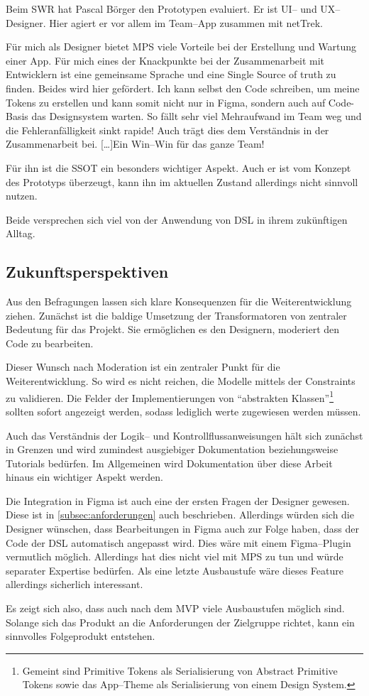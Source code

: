Beim \ac{SWR} hat Pascal Börger den Prototypen evaluiert.
Er ist \acs{UI}-- und \acs{UX}--Designer.
Hier agiert er vor allem im Team--App zusammen mit \ac{netTrek}.
\begin{displayquote}
    Für mich als Designer bietet MPS viele Vorteile bei der Erstellung und Wartung einer App.
    Für mich eines der Knackpunkte bei der Zusammenarbeit mit Entwicklern ist eine gemeinsame Sprache und eine Single Source of truth zu finden.
    Beides wird hier gefördert.
    Ich kann selbst den Code schreiben, um meine Tokens zu erstellen und kann somit nicht nur in Figma, sondern auch auf Code-Basis das Designsystem warten.
    So fällt sehr viel Mehraufwand im Team weg und die Fehleranfälligkeit sinkt rapide!
    Auch trägt dies dem Verständnis in der Zusammenarbeit bei.
    [\ldots]\@ Ein Win--Win für das ganze Team!
\end{displayquote}
Für ihn ist die \ac{SSOT} ein besonders wichtiger Aspekt.
Auch er ist vom Konzept des Prototyps überzeugt, kann ihn im aktuellen Zustand allerdings nicht sinnvoll nutzen.

Beide versprechen sich viel von der Anwendung von \ac{DSL} in ihrem zukünftigen Alltag.

\subsection{Zukunftsperspektiven}\label{subsec:zukunftsperspektive}
Aus den Befragungen lassen sich klare Konsequenzen für die Weiterentwicklung ziehen.
Zunächst ist die baldige Umsetzung der Transformatoren von zentraler Bedeutung für das Projekt.
Sie ermöglichen es den Designern, moderiert den Code zu bearbeiten.

Dieser Wunsch nach Moderation ist ein zentraler Punkt für die Weiterentwicklung.
So wird es nicht reichen, die Modelle mittels der Constraints zu validieren.
Die Felder der Implementierungen von \enquote{abstrakten Klassen}\footnote{Gemeint sind Primitive Tokens als Serialisierung von Abstract Primitive Tokens sowie das App--Theme als Serialisierung von einem Design System.} sollten sofort angezeigt werden, sodass lediglich werte zugewiesen werden müssen.

Auch das Verständnis der Logik-- und Kontrollflussanweisungen hält sich zunächst in Grenzen und wird zumindest ausgiebiger Dokumentation beziehungsweise Tutorials bedürfen.
Im Allgemeinen wird Dokumentation über diese Arbeit hinaus ein wichtiger Aspekt werden.

Die Integration in Figma ist auch eine der ersten Fragen der Designer gewesen.
Diese ist in \autoref{subsec:anforderungen} auch beschrieben.
Allerdings würden sich die Designer wünschen, dass Bearbeitungen in Figma auch zur Folge haben, dass der Code der \ac{DSL} automatisch angepasst wird.
Dies wäre mit einem Figma--Plugin vermutlich möglich.
Allerdings hat dies nicht viel mit \ac{MPS} zu tun und würde separater Expertise bedürfen.
Als eine letzte Ausbaustufe wäre dieses Feature allerdings sicherlich interessant.

Es zeigt sich also, dass auch nach dem \ac{MVP} viele Ausbaustufen möglich sind.
Solange sich das Produkt an die Anforderungen der Zielgruppe richtet, kann ein sinnvolles Folgeprodukt entstehen.